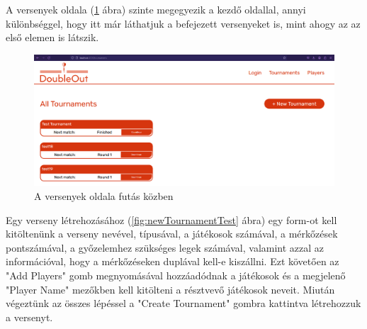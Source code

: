 A versenyek oldala (\ref{fig:tournamentsTest} ábra) szinte megegyezik a kezdő oldallal, annyi különbséggel, hogy itt már láthatjuk a befejezett versenyeket is, mint ahogy az az első elemen is látszik.

\begin{figure}[h]
\centering
\includegraphics[scale=0.3]{images/TournamentsTest.png}
\caption{A versenyek oldala futás közben}
\label{fig:tournamentsTest}
\end{figure}

Egy verseny létrehozásához (\ref{fig:newTournamentTest} ábra) egy form-ot kell kitöltenünk a verseny nevével, típusával, a játékosok számával, a mérkőzések pontszámával, a győzelemhez szükséges legek számával, valamint azzal az információval, hogy a mérkőzéseken duplával kell-e kiszállni. Ezt követően az "Add Players" gomb megnyomásával hozzáadódnak a játékosok és a megjelenő "Player Name" mezőkben kell kitölteni a résztvevő játékosok neveit. Miután végeztünk az összes lépéssel a "Create Tournament" gombra kattintva létrehozzuk a versenyt.

